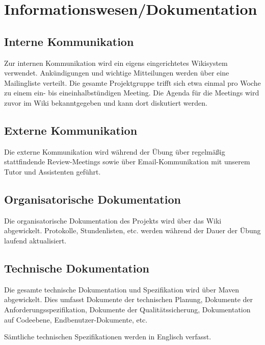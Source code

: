 

\section{Informationswesen/Dokumentation}
\subsection{Interne Kommunikation}
Zur internen Kommunikation wird ein eigens eingerichtetes Wikisystem verwendet.
Ankündigungen und wichtige Mitteilungen werden über eine Mailingliste verteilt. 
Die gesamte Projektgruppe trifft sich etwa einmal pro Woche zu einem ein- bis eineinhalbstündigen Meeting. 
Die Agenda für die Meetings wird zuvor im Wiki bekanntgegeben und kann dort diskutiert werden. 

\subsection{Externe Kommunikation}
Die externe Kommunikation wird während der Übung über regelmäßig stattfindende Review-Meetings sowie über Email-Kommunikation mit unserem Tutor und Assistenten geführt.

\subsection{Organisatorische Dokumentation}
Die organisatorische Dokumentation des Projekts wird über das Wiki abgewickelt. 
Protokolle, Stundenlisten, etc. werden während der Dauer der Übung laufend aktualisiert.

\subsection{Technische Dokumentation}
Die gesamte technische Dokumentation und Spezifikation wird über Maven abgewickelt. 
Dies umfasst Dokumente der technischen Planung, Dokumente der Anforderungsspezifikation, 
Dokumente der Qualitätssicherung, Dokumentation auf Codeebene, Endbenutzer-Dokumente, etc.

Sämtliche technischen Spezifikationen werden in Englisch verfasst.
